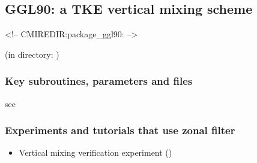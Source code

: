 \subsection{GGL90: a TKE vertical mixing scheme}
\label{sec:ggl90}
\begin{rawhtml}
<!-- CMIREDIR:package_ggl90: -->
\end{rawhtml}
\begin{center}
(in directory: )
\end{center}

\subsubsection{Key subroutines, parameters and files}
\label{sec:pkg:ggl90:implementation_synopsis}
see \cite{gas-eta:90}

\subsubsection{Experiments and tutorials that use zonal filter}
\label{sec:pkg:ggl90:experiments}

\begin{itemize}
\item Vertical mixing verification experiment ()

\end{itemize}

